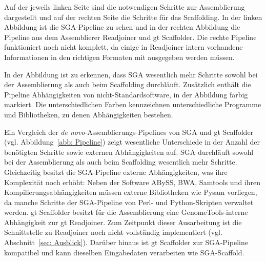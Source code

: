 \documentclass[a4paper,10pt,parskip]{scrartcl}
\begin{document}
Auf der jeweils linken Seite sind die notwendigen Schritte zur
Assemblierung dargestellt und auf der rechten Seite die Schritte für
das Scaffolding. In der linken Abbildung ist die SGA-Pipeline zu sehen
und in der rechten Abbildung die Pipeline aus dem Assemblierer
Readjoiner und gt Scaffolder. Die rechte Pipeline funktioniert noch
nicht komplett, da einige in Readjoiner intern vorhandene
Informationen in den richtigen Formaten mit ausgegeben werden müssen.

In der Abbildung ist zu erkennen, dass SGA wesentlich mehr Schritte
sowohl bei der Assemblierung als auch beim Scaffolding
durchläuft. Zusätzlich enthält die Pipeline Abhängigkeiten von
nicht-Standardsoftware, in der Abbildung farbig markiert. Die
unterschiedlichen Farben kennzeichnen unterschiedliche Programme und
Bibliotheken, zu denen Abhängigkeiten bestehen.  

Ein Vergleich der \textit{de novo}-Assemblierungs-Pipelines von SGA und gt
Scaffolder (vgl. Abbildung~\ref{abb: Pipeline}) zeigt wesentliche Unterschiede
in der Anzahl der benötigten Schritte sowie externen Abhängigkeiten auf.
SGA durchläuft sowohl bei der Assemblierung als auch beim Scaffolding wesentlich
mehr Schritte. Gleichzeitig besitzt die SGA-Pipeline externe Abhängigkeiten,
was ihre Komplexität noch erhöht: Neben der Software ABySS, BWA, Samtools und
ihren Kompilierungsabhängigkeiten müssen externe Bibliotheken wie Pysam
vorliegen, da manche Schritte der SGA-Pipeline von Perl- und Python-Skripten
verwaltet werden.
gt Scaffolder besitzt für die Assemblierung eine GenomeTools-interne
Abhängigkeit zur gt Readjoiner. Zum Zeitpunkt dieser Ausarbeitung ist die
Schnittstelle zu Readjoiner noch nicht vollständig implementiert
(vgl. Abschnitt~\ref{sec: Ausblick}). Darüber hinaus ist gt Scaffolder zur
SGA-Pipeline kompatibel und kann dieselben Eingabedaten verarbeiten wie
SGA-Scaffold.
\end{document}
